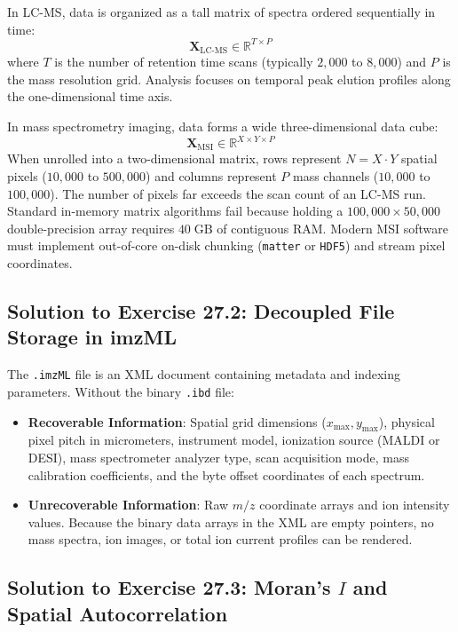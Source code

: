\documentclass[11pt,twoside,openright]{book}
\begin{document}
In LC-MS, data is organized as a tall matrix of spectra ordered sequentially in time:
\begin{equation}
\mathbf{X}_{\text{LC-MS}} \in \mathbb{R}^{T \times P}
\end{equation}
where $T$ is the number of retention time scans (typically $2{,}000$ to $8{,}000$) and $P$ is the mass resolution grid. Analysis focuses on temporal peak elution profiles along the one-dimensional time axis.

In mass spectrometry imaging, data forms a wide three-dimensional data cube:
\begin{equation}
\mathbf{X}_{\text{MSI}} \in \mathbb{R}^{X \times Y \times P}
\end{equation}
When unrolled into a two-dimensional matrix, rows represent $N = X \cdot Y$ spatial pixels ($10{,}000$ to $500{,}000$) and columns represent $P$ mass channels ($10{,}000$ to $100{,}000$). The number of pixels far exceeds the scan count of an LC-MS run. Standard in-memory matrix algorithms fail because holding a $100{,}000 \times 50{,}000$ double-precision array requires $40\;\text{GB}$ of contiguous RAM. Modern MSI software must implement out-of-core on-disk chunking (\texttt{matter} or \texttt{HDF5}) and stream pixel coordinates.

\subsection{Solution to Exercise 27.2: Decoupled File Storage in imzML}

The \texttt{.imzML} file is an XML document containing metadata and indexing parameters. Without the binary \texttt{.ibd} file:
\begin{itemize}
    \item \textbf{Recoverable Information}: Spatial grid dimensions ($x_{\max}, y_{\max}$), physical pixel pitch in micrometers, instrument model, ionization source (MALDI or DESI), mass spectrometer analyzer type, scan acquisition mode, mass calibration coefficients, and the byte offset coordinates of each spectrum.
    \item \textbf{Unrecoverable Information}: Raw $m/z$ coordinate arrays and ion intensity values. Because the binary data arrays in the XML are empty pointers, no mass spectra, ion images, or total ion current profiles can be rendered.
\end{itemize}

\subsection{Solution to Exercise 27.3: Moran's \texorpdfstring{$I$}{I} and Spatial Autocorrelation}
\end{document}
